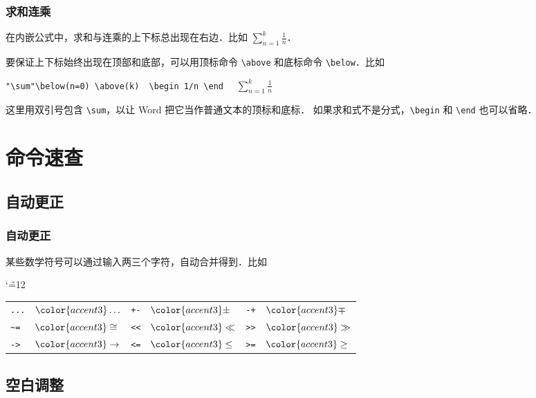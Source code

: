 \documentclass[12pt,notheorems,xcolor={rgb}]{beamer}
\let\lst=\lstinline
\newenvironment{framex}{\begin{frame}[fragile=singleslide,environment=framex]}{\end{frame}}
\def\demo#1{\textcolor{accent3}{#1}}
\newcommand{\out}[1]{{$\color{accent3}#1$}}
\begin{document}
\begin{framex}
\frametitle{求和连乘}
在内嵌公式中，求和与连乘的上下标总出现在右边．比如 \demo{$\sum_{n=1}^k\frac{1}{n}$}．
\par
要保证上下标始终出现在顶部和底部，可以用顶标命令 \lst!\above! 和底标命令 \lst!\below!．比如
\begin{examplev}
\lst!"\sum"\below(n=0) \above(k)  \begin 1/n \end  !
\tcblower
$\sum\limits_{n=1}^k\tfrac{1}{n}$
\end{examplev}
这里用双引号包含 \lst!\sum!，以让 Word 把它当作普通文本的顶标和底标．
如果求和式不是分式，\lst!\begin! 和 \lst!\end! 也可以省略．
\end{framex}

\section{命令速查}

\subsection{自动更正}

\begin{framex}
\frametitle{自动更正}
某些数学符号可以通过输入两三个字符，自动合并得到．比如\par
\catcode`\~=12
\begin{tabularx}{\textwidth}{|*{3}{XX|}}
  \hline
  \lst!...! & \out{\ldots} &
  \lst!+-!  & \out{\pm} &
  \lst!-+!  & \out{\mp} \\
  \lst!~=!  & \out{\cong} &
  \lst!<<!  & \out{\ll} &
  \lst!>>!  & \out{\gg} \\
  \lst!->!  & \out{\rightarrow} &
  \lst!<=!  & \out{\leq} &
  \lst!>=!  & \out{\geq} \\
  \hline
\end{tabularx}
\end{framex}

\subsection{空白调整}
\end{document}
